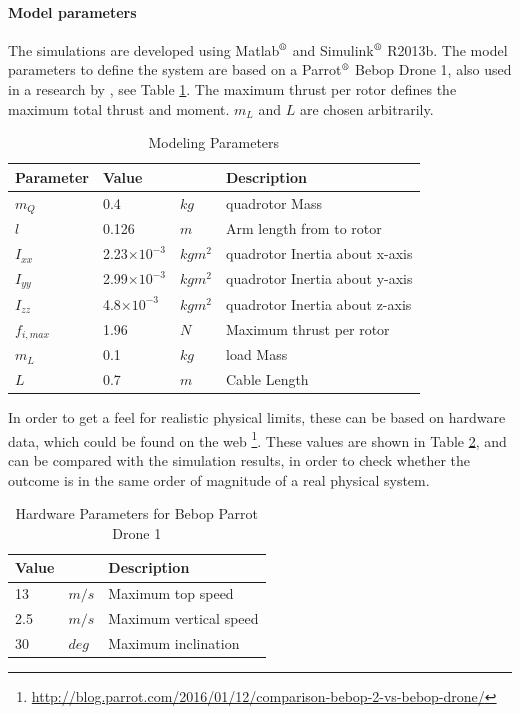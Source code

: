 \paragraph{Model parameters}
The simulations are developed using Matlab$^\text{\textregistered} $ and Simulink$^\text{\textregistered} $ R2013b.
The model parameters to define the system are based on a Parrot$^\text{\textregistered} $ Bebop Drone 1, also used in a research by \cite{Cornelis2014}, see Table \ref{tab:set.par}. The maximum thrust per rotor defines the maximum total thrust and moment. $ m_L $ and $ L $ are chosen arbitrarily.
\begin{table}[h!]
	\centering
	\begin{tabular}{|l|ll|l|}
		\hline
		\textbf{Parameter}&\textbf{Value}&&\textbf{Description}\\
		\hline
		$ m_Q $&0.4& $ kg $&quadrotor Mass\\
		$ l $&0.126& $ m $&Arm length from \a{qr} \a{cm} to rotor\\
		$ I_{xx} $&2.23$ \times 10^{-3}$&$kgm^2 $&quadrotor Inertia about x-axis\\
		$ I_{yy} $&2.99$ \times 10^{-3}$&$kgm^2 $&quadrotor Inertia about y-axis\\
		$ I_{zz} $&4.8$ \times 10^{-3}$&$kgm^2 $&quadrotor Inertia about z-axis\\
    	$ f_{i,max} $&1.96 &$ N $&Maximum thrust per rotor\\
		$ m_L $&0.1 &$ kg $&load Mass\\
		$ L $&0.7 &$ m $& Cable Length\\		
		\hline		
	\end{tabular}
	\caption{Modeling Parameters}
	\label{tab:set.par}
\end{table}

In order to get a feel for realistic physical limits, these can be based on hardware data, which could be found on the web \footnote{\url{http://blog.parrot.com/2016/01/12/comparison-bebop-2-vs-bebop-drone/}\label{url:set.bebop}}. 
These values are shown in Table \ref{tab:set.par2}, and can be compared with the simulation results, in order to check whether the outcome is in the same order of magnitude of a real physical system.
\begin{table}[h!]
	\centering
	\begin{tabular}{|ll|l|}
		\hline
		\textbf{Value}&&\textbf{Description}\\
		\hline
		13 & $ m/s $&Maximum top speed\\
		2.5& $ m/s $&Maximum vertical speed\\
		30 &$ deg $&Maximum inclination\\
		\hline
	\end{tabular}
	\caption{Hardware Parameters for Bebop Parrot Drone 1}
	\label{tab:set.par2}
\end{table}


